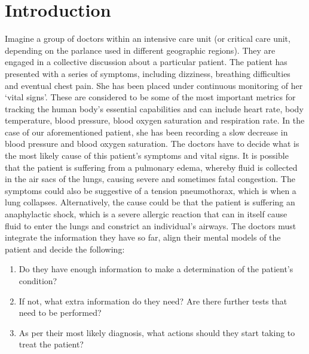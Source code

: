 \documentclass[a4paper, nobind]{templates/ociamthesis}
\providecommand{\tightlist}{%
  \setlength{\itemsep}{0pt}\setlength{\parskip}{0pt}}
\begin{document}
\hypertarget{introduction}{%
\chapter*{Introduction}\label{introduction}}

\adjustmtc
{}

Imagine a group of doctors within an intensive care unit (or critical care unit, depending on the parlance used in different geographic regions). They are engaged in a collective discussion about a particular patient. The patient has presented with a series of symptoms, including dizziness, breathing difficulties and eventual chest pain. She has been placed under continuous monitoring of her `vital signs'. These are considered to be some of the most important metrics for tracking the human body's essential capabilities and can include heart rate, body temperature, blood pressure, blood oxygen saturation and respiration rate. In the case of our aforementioned patient, she has been recording a slow decrease in blood pressure and blood oxygen saturation. The doctors have to decide what is the most likely cause of this patient's symptoms and vital signs. It is possible that the patient is suffering from a pulmonary edema, whereby fluid is collected in the air sacs of the lungs, causing severe and sometimes fatal congestion. The symptoms could also be suggestive of a tension pneumothorax, which is when a lung collapses. Alternatively, the cause could be that the patient is suffering an anaphylactic shock, which is a severe allergic reaction that can in itself cause fluid to enter the lungs and constrict an individual's airways. The doctors must integrate the information they have so far, align their mental models of the patient and decide the following:

\begin{enumerate}
\def\labelenumi{\arabic{enumi}.}
\tightlist
\item
  Do they have enough information to make a determination of the patient's condition?
\item
  If not, what extra information do they need? Are there further tests that need to be performed?
\item
  As per their most likely diagnosis, what actions should they start taking to treat the patient?
\end{enumerate}
\end{document}
